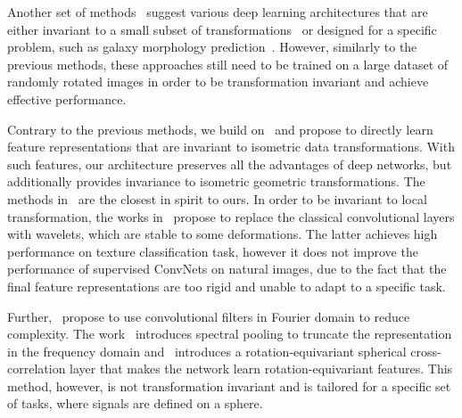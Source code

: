 \documentclass[10pt,journal,compsoc]{IEEEtran}
\begin{document}
	Another set of methods~\cite{bb:cohen2016group, bb:dieleman2015rotation, bb:dieleman-cyclic-2016} suggest various deep learning architectures that are either invariant to a small subset of transformations~\cite{bb:cohen2016group, bb:dieleman-cyclic-2016} or designed for a specific problem, such as galaxy morphology prediction~\cite{bb:dieleman2015rotation}. However, similarly to the previous methods, these approaches still need to be trained on a large dataset of randomly rotated images in order to be transformation invariant and achieve effective performance.
	
	
	Contrary to the previous methods, we build on~\cite{bb:KhasanovaF17} and propose to directly learn feature representations that are invariant to isometric data transformations. With such features, our architecture preserves all the advantages of deep networks, but additionally provides invariance to isometric geometric transformations. The methods in~\cite{bb:oyallon2015deep, bb:bruna2013invariant, bb:harm} are the closest in spirit to ours. In order to be invariant to local transformation, the works in~\cite{bb:oyallon2015deep, bb:bruna2013invariant} propose to replace the classical convolutional layers with wavelets, which are stable to some deformations. The latter achieves high performance on texture classification task, however it does not improve the performance of supervised ConvNets on natural images, due to the fact that the final feature representations are too rigid and unable to adapt to a specific task. 
	
	Further,~\cite{bb:rev1, bb:Cohen2018, bb:rev2} propose to use convolutional filters in Fourier domain to reduce complexity. The work~\cite{bb:rev2} introduces spectral pooling to truncate the representation in the frequency domain and~\cite{bb:Cohen2018} introduces a rotation-equivariant spherical cross-correlation layer that makes the network learn rotation-equivariant features. This method, however, is not transformation invariant and is tailored for a specific set of tasks, where signals are defined on a sphere. 
	
\end{document}
